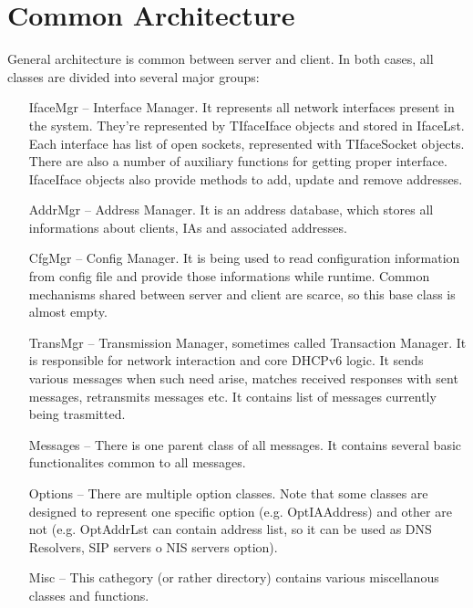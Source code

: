 
\section{Common Architecture}

General architecture is common between server and client. In both
cases, all classes are divided into several major groups:
\begin{itemize}
\item[IfaceMgr] -- Interface Manager. It represents all network interfaces present in the
  system. They're represented by TIfaceIface objects and stored in
  IfaceLst. Each interface has list of open sockets, represented with
  TIfaceSocket objects. There are also a number of auxiliary functions
  for getting proper interface. IfaceIface objects  also provide
  methods to add, update and remove addresses.
\item [AddrMgr] -- Address Manager. It is an address database, which
  stores all informations about clients, IAs and associated addresses.
\item [CfgMgr] -- Config Manager. It is being used to read
  configuration information from config file and provide those
  informations while runtime. Common mechanisms shared between server
  and client are scarce, so this base class is almost empty.
\item [TransMgr] -- Transmission Manager, sometimes called Transaction
  Manager. It is responsible for network interaction and core DHCPv6
  logic. It sends various messages when such need arise, matches received
  responses with sent messages, retransmits messages etc. It contains
  list of messages currently being trasmitted. 
\item[Messages] -- There is one parent class of all messages. It
  contains several basic functionalites common to all messages.
\item[Options] -- There are multiple option classes. Note that some
  classes are designed to represent one specific option
  (e.g. OptIAAddress) and other are not (e.g. OptAddrLst can contain
  address list, so it can be used as DNS Resolvers, SIP servers o NIS
  servers option). 
\item[Misc] -- This cathegory (or rather directory) contains various
  miscellanous classes and functions.
\end{itemize}

